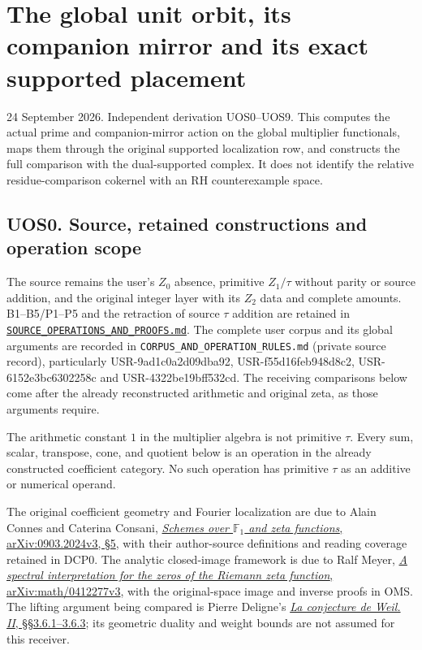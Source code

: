 \section{The global unit orbit, its companion mirror and its exact
supported
placement}\label{the-global-unit-orbit-its-companion-mirror-and-its-exact-supported-placement}

24 September 2026. Independent derivation UOS0--UOS9. This computes the
actual prime and companion-mirror action on the global multiplier
functionals, maps them through the original supported localization row,
and constructs the full comparison with the dual-supported complex. It
does not identify the relative residue-comparison cokernel with an RH
counterexample space.

\subsection{UOS0. Source, retained constructions and operation
scope}\label{uos0.-source-retained-constructions-and-operation-scope}

The source remains the user's \(Z_0\) absence, primitive \(Z_1/\tau\)
without parity or source addition, and the original integer layer with
its \(Z_2\) data and complete amounts. B1--B5/P1--P5 and the retraction
of source \(\tau\) addition are retained in
\href{../foundations/user_definitions_20260924/SOURCE_OPERATIONS_AND_PROOFS.md}{\nolinkurl{SOURCE_OPERATIONS_AND_PROOFS.md}}.
The complete user corpus and its global arguments are recorded in
\nolinkurl{CORPUS_AND_OPERATION_RULES.md} (private source record), particularly USR-9ad1c0a2d09dba92,
USR-f55d16feb948d8c2, USR-6152e3bc6302258c and USR-4322be19bff532cd. The
receiving comparisons below come after the already reconstructed
arithmetic and original zeta, as those arguments require.

The arithmetic constant \(1\) in the multiplier algebra is not primitive
\(\tau\). Every sum, scalar, transpose, cone, and quotient below is an
operation in the already constructed coefficient category. No such
operation has primitive \(\tau\) as an additive or numerical operand.

The original coefficient geometry and Fourier localization are due to
Alain Connes and Caterina Consani,
\href{https://arxiv.org/abs/0903.2024v3}{\emph{Schemes over
\(\mathbb F_1\) and zeta functions}, arXiv:0903.2024v3, §5}, with their
author-source definitions and reading coverage retained in DCP0. The
analytic closed-image framework is due to Ralf Meyer,
\href{https://arxiv.org/abs/math/0412277v3}{\emph{A spectral
interpretation for the zeros of the Riemann zeta function},
arXiv:math/0412277v3}, with the original-space image and inverse proofs
in OMS. The lifting argument being compared is Pierre Deligne's
\href{https://www.numdam.org/item/PMIHES_1980__52__137_0/}{\emph{La
conjecture de Weil. II}, §§3.6.1--3.6.3}; its geometric duality and
weight bounds are not assumed for this receiver.

